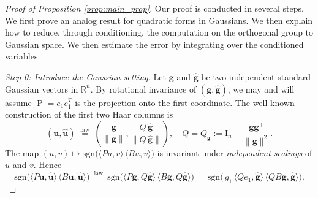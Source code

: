 \documentclass[reqno]{amsart}
\numberwithin{equation}{section}
\newcommand\R{\mathbb{R}}
\newcommand\bg{\bm{g}}
\newcommand\hg{\hat{\bm g}}
\newcommand\bu{\bm{u}}
\newcommand\hu{\hat{\bm u}}
\newcommand\proj{{\operatorname{P}}}
\begin{document}
\begin{proof}[Proof of Proposition \ref{prop:main_prop}]
Our proof is conducted in several steps. We first prove an analog result for quadratic forms in Gaussians. We then explain how to reduce, through conditioning, the computation on the orthogonal group to Gaussian space. We then estimate the error by integrating over the conditioned variables.

\emph{Step 0: Introduce the Gaussian setting.} Let $\bg$ and $\hg$ be two independent standard Gaussian vectors in $\R^n$. By rotational invariance of $(\bg,\hg)$, we may and will assume $\proj=e_{1}e_{1}^T$ is the projection onto the first coordinate. 
The well-known construction of the first two Haar columns is
\[
(\bu,\hu) \;\stackrel{\mathrm{law}}=\; \left(\frac{\bg}{\|\bg\|}, \frac{Q\,\hg}{\|Q\,\hg\|}\right),
\quad
Q=Q_{\bg}:=\mathrm{I}_n-\frac{\bg\bg^\top}{\|\bg\|^2}.
\]
The map
$(u,v)\mapsto \mathrm{sgn}\big(\langle Pu,v\rangle\,\langle Bu,v\rangle\big)$
is invariant under \emph{independent scalings} of $u$ and $v$.
Hence
\[
\mathrm{sgn}\!\big(\langle P\bu,\hu\rangle\,\langle B\bu,\hu\rangle\big)
\ \stackrel{\mathrm{law}}=\ 
\mathrm{sgn}\!\big(\langle P\bg,Q\hg\rangle\,\langle B\bg,Q\hg\rangle\big)=\ 
\mathrm{sgn}\!\big(\, g_{1}\,\langle Qe_1,\hg\rangle\,\langle QB\bg,\hg\rangle\big).
\]


\end{proof}
\end{document}
